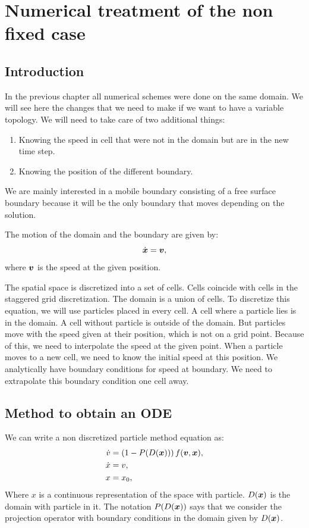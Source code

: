 \chapter{Numerical treatment of the non fixed case }
\minitoc
\section{Introduction}
In the previous chapter all numerical schemes were done on the same domain.
We will see here the changes that we need to make if we want to have a variable topology.
We will need to take care of two additional things:
\begin{enumerate}
\item Knowing the speed in cell that were not in the domain but are in the new time step.
\item Knowing the position of the different boundary.
\end{enumerate}

We are mainly interested in a mobile boundary consisting of a free surface boundary because it will be the only
boundary that moves depending on the solution.

The motion of the domain and the boundary are given by:
\begin{equation}
\dot{{\boldsymbol {x}}}={\boldsymbol {v}},
\end{equation}
where ${\boldsymbol {v}}$ is the speed at the given position.

The spatial space is discretized into a set of cells. Cells coincide with cells in the staggered grid discretization.
The domain is a union of cells.
To discretize this equation, we will use particles  placed in every cell. A cell where a particle lies is in the domain.
A cell without particle is outside of the domain.
But particles move with the speed given at their position, which is not on a grid point.
Because of this, we need to interpolate the speed at the given point.
When a particle moves to a new cell, we need to know the initial speed at this position.
We analytically have boundary conditions for speed at boundary.
We need to extrapolate this boundary condition one cell away.

\section{Method to obtain an ODE}

We can write a non discretized particle method equation as:
\begin{align*}
	\dot{v}&=\left(1 - P(D({\boldsymbol {x}}))\right)f({\boldsymbol {v}},{\boldsymbol {x}}),\\
	\dot{x}&=v,\\
	x&=x_{0},
\end{align*}
Where $x$ is a continuous representation of the space with particle.
$D({\boldsymbol {x}})$ is the domain with particle in it.
The notation $P(D({\boldsymbol {x}}))$ says that we consider the projection operator with boundary conditions in the domain given by $D({\boldsymbol {x}})$.

